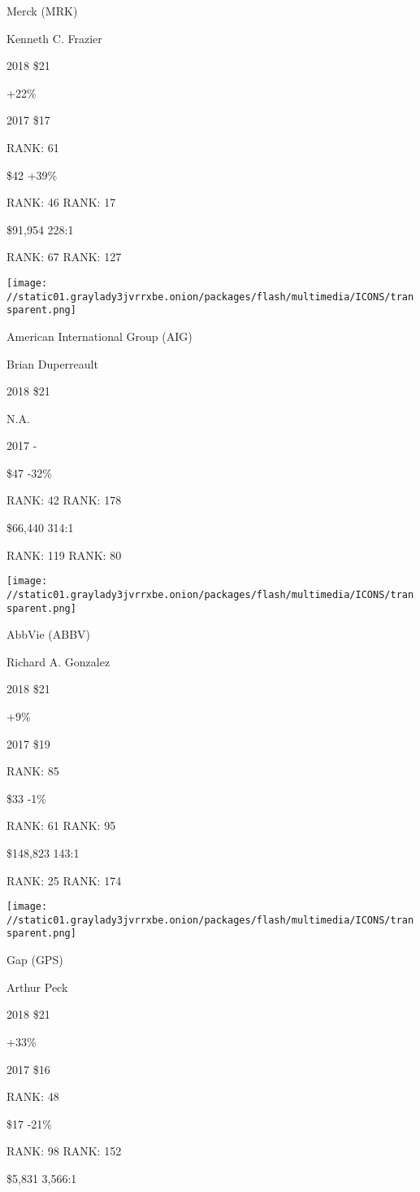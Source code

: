 Merck (MRK)

Kenneth C. Frazier \protect\hyperlink{g-footnotes}{}

2018 \$21

 +22\%

2017 \$17

RANK: 61

 \$42 +39\%

RANK: 46 RANK: 17

 \$91,954 228:1

RANK: 67 RANK: 127

\texttt{[image: //static01.graylady3jvrrxbe.onion/packages/flash/multimedia/ICONS/transparent.png]}

American International Group (AIG)

Brian Duperreault \protect\hyperlink{g-footnotes}{}

2018 \$21

 N.A.

2017 -

 \$47 -32\%

RANK: 42 RANK: 178

 \$66,440 314:1

RANK: 119 RANK: 80

\texttt{[image: //static01.graylady3jvrrxbe.onion/packages/flash/multimedia/ICONS/transparent.png]}

AbbVie (ABBV)

Richard A. Gonzalez \protect\hyperlink{g-footnotes}{}

2018 \$21

 +9\%

2017 \$19

RANK: 85

 \$33 -1\%

RANK: 61 RANK: 95

 \$148,823 143:1

RANK: 25 RANK: 174

\texttt{[image: //static01.graylady3jvrrxbe.onion/packages/flash/multimedia/ICONS/transparent.png]}

Gap (GPS)

Arthur Peck \protect\hyperlink{g-footnotes}{}

2018 \$21

 +33\%

2017 \$16

RANK: 48

 \$17 -21\%

RANK: 98 RANK: 152

 \$5,831 3,566:1

